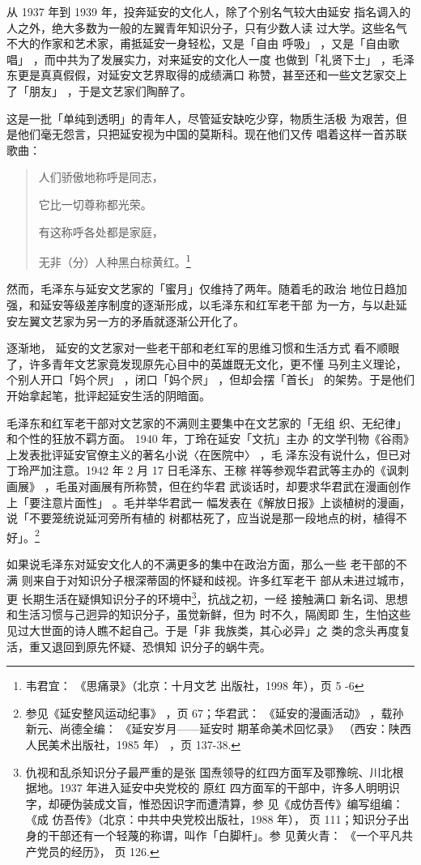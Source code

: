 从 1937 年到 1939 年，投奔延安的文化人，除了个别名气较大由延安
指名调入的人之外，绝大多数为一般的左翼青年知识分子，只有少数人读
过大学。这些名气不大的作家和艺术家，甫抵延安一身轻松，又是「自由
呼吸」
，又是「自由歌唱」
，而中共为了发展实力，对来延安的文化人一度
也做到「礼贤下士」
，毛泽东更是真真假假，对延安文艺界取得的成绩满口
称赞，甚至还和一些文艺家交上了「朋友」
，于是文艺家们陶醉了。

这是一批「单纯到透明」的青年人，尽管延安缺吃少穿，物质生活极
为艰苦，但是他们毫无怨言，只把延安视为中国的莫斯科。现在他们又传
唱着这样一首苏联歌曲：
\begin{quote}
	
\fzwkai 人们骄傲地称呼是同志，

它比一切尊称都光荣。

有这称呼各处都是家庭，

无非（分）人种黑白棕黄红。\footnote{韦君宜： 《思痛录》（北京：十月文艺
出版社，1998 年），页 5 -6 }
\end{quote}

然而，毛泽东与延安文艺家的「蜜月」仅维持了两年。随着毛的政治
地位日趋加强，和延安等级差序制度的逐渐形成，以毛泽东和红军老干部
为一方，与以赴延安左翼文艺家为另一方的矛盾就逐渐公开化了。

逐渐地，
延安的文艺家对一些老干部和老红军的思维习惯和生活方式
看不顺眼了，许多青年文艺家竟发现原先心目中的英雄既无文化，更不懂
马列主义理论，个别人开口「妈个屄」
，闭口「妈个屄」
，但却会摆「首长」
的架势。于是他们开始拿起笔，批评起延安生活的阴暗面。
 
 毛泽东和红军老干部对文艺家的不满则主要集中在文艺家的「无组
织、无纪律」和个性的狂放不羁方面。
1940 年，丁玲在延安「文抗」主办
的文学刊物《谷雨》上发表批评延安官僚主义的著名小说〈在医院中〉
，毛
泽东没有说什么，但已对丁玲严加注意。1942 年 2 月 17 日毛泽东、王稼
祥等参观华君武等主办的《讽刺画展》
，毛虽对画展有所称赞，但在约华君
武谈话时，却要求华君武在漫画创作上「要注意片面性」
。毛并举华君武一
幅发表在《解放日报》上谈植树的漫画，说「不要笼统说延河旁所有植的
树都枯死了，应当说是那一段地点的树，植得不好」。\footnote{参见《延安整风运动纪事》
，页 67；华君武：
《延安的漫画活动》
，载孙新元、尚德全编：
《延安岁月——延安时
期革命美术回忆录》
（西安：陕西人民美术出版社，1985 年）
，页 137-38.} 

如果说毛泽东对延安文化人的不满更多的集中在政治方面，那么一些 老干部的不满
则来自于对知识分子根深蒂固的怀疑和歧视。许多红军老干 部从未进过城市，更
长期生活在疑惧知识分子的环境中\footnote{仇视和乱杀知识分子最严重的是张
国焘领导的红四方面军及鄂豫皖、川北根据地。1937 年进入延安中央党校的 原红
四方面军的干部中，许多人明明识字，却硬伪装成文盲，惟恐因识字而遭清算，参
见《成仿吾传》编写组编： 《成 仿吾传》（北京：中共中央党校出版社，1988
年）， 页 111；知识分子出身的干部还有一个轻蔑的称谓，叫作「白脚杆」。参
见黄火青： 《一个平凡共产党员的经历》， 页 126.}，抗战之初，一经 接触满口
新名词、思想和生活习惯与己迥异的知识分子，虽觉新鲜，但为 时不久，隔阂即
生，生怕这些见过大世面的诗人瞧不起自己。于是「非 我族类，其心必异」之
类的念头再度复活，重又退回到原先怀疑、恐惧知 识分子的蜗牛壳。

